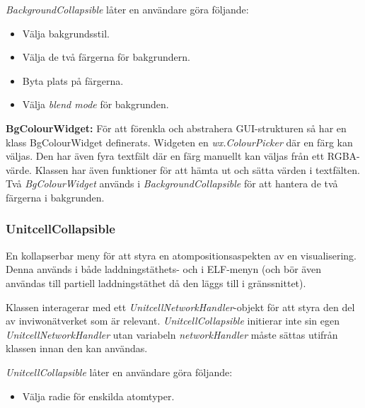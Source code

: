 \textit{BackgroundCollapsible} låter en användare göra följande:
\begin{itemize}
    \setlength\itemsep{0em}
    \item Välja bakgrundsstil.
    \item Välja de två färgerna för bakgrundern.
    \item Byta plats på färgerna.
    \item Välja \textit{blend mode} för bakgrunden.
\end{itemize}


\textbf{BgColourWidget: } För att förenkla och abstrahera GUI-strukturen så har en klass BgColourWidget definerats. Widgeten en \textit{wx.ColourPicker} där en färg kan väljas. Den har även fyra textfält där en färg manuellt kan väljas från ett RGBA-värde. Klassen har även funktioner för att hämta ut och sätta värden i textfälten. Två \textit{BgColourWidget} används i \textit{BackgroundCollapsible} för att hantera de två färgerna i bakgrunden.


\subsubsection{UnitcellCollapsible}
En kollapserbar meny för att styra en atompositionsaspekten av en visualisering. Denna används i både laddningstäthets- och i ELF-menyn (och bör även användas till partiell laddningstäthet då den läggs till i gränssnittet).

Klassen interagerar med ett \textit{UnitcellNetworkHandler}-objekt för att styra den del av inviwonätverket som är relevant. \textit{UnitcellCollapsible} initierar inte sin egen \textit{UnitcellNetworkHandler} utan variabeln \textit{networkHandler} måste sättas utifrån klassen innan den kan användas.

\newpage

\textit{UnitcellCollapsible} låter en användare göra följande:
\begin{itemize}
    \setlength\itemsep{0em}
    \item Välja radie för enskilda atomtyper.
\end{itemize}



